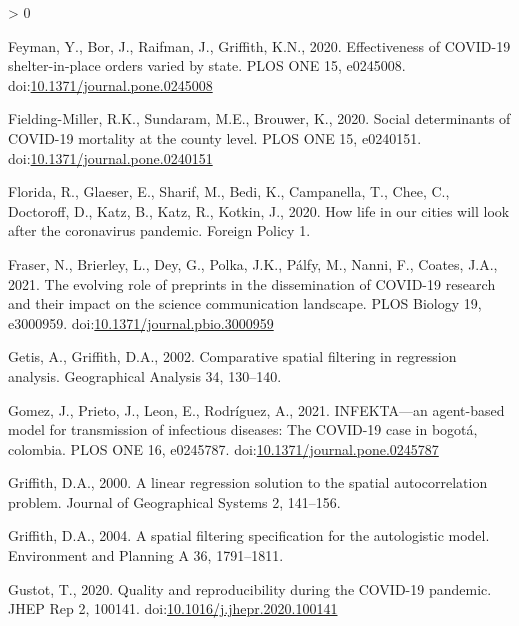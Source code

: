 \documentclass[]{elsarticle} %
\newlength{\cslhangindent}
\newenvironment{CSLReferences}[2] %
 {%
  \setlength{\parindent}{0pt}
  \ifodd #1 \everypar{\setlength{\hangindent}{\cslhangindent}}\ignorespaces\fi
  \ifnum #2 > 0
  \setlength{\parskip}{#2\baselineskip}
  \fi
 }%
 {}
\begin{document}
\begin{CSLReferences}{1}{0}
\leavevmode\hypertarget{ref-Feyman2020effectiveness}{}%
Feyman, Y., Bor, J., Raifman, J., Griffith, K.N., 2020. Effectiveness of
COVID-19 shelter-in-place orders varied by state. PLOS ONE 15, e0245008.
doi:\href{https://doi.org/10.1371/journal.pone.0245008}{10.1371/journal.pone.0245008}

\leavevmode\hypertarget{ref-Fielding2020social}{}%
Fielding-Miller, R.K., Sundaram, M.E., Brouwer, K., 2020. Social
determinants of COVID-19 mortality at the county level. PLOS ONE 15,
e0240151.
doi:\href{https://doi.org/10.1371/journal.pone.0240151}{10.1371/journal.pone.0240151}

\leavevmode\hypertarget{ref-Florida2020how}{}%
Florida, R., Glaeser, E., Sharif, M., Bedi, K., Campanella, T., Chee,
C., Doctoroff, D., Katz, B., Katz, R., Kotkin, J., 2020. How life in our
cities will look after the coronavirus pandemic. Foreign Policy 1.

\leavevmode\hypertarget{ref-Fraser2021evolving}{}%
Fraser, N., Brierley, L., Dey, G., Polka, J.K., Pálfy, M., Nanni, F.,
Coates, J.A., 2021. The evolving role of preprints in the dissemination
of COVID-19 research and their impact on the science communication
landscape. PLOS Biology 19, e3000959.
doi:\href{https://doi.org/10.1371/journal.pbio.3000959}{10.1371/journal.pbio.3000959}

\leavevmode\hypertarget{ref-Getis2002comparative}{}%
Getis, A., Griffith, D.A., 2002. Comparative spatial filtering in
regression analysis. Geographical Analysis 34, 130--140.

\leavevmode\hypertarget{ref-Gomez2021infekta}{}%
Gomez, J., Prieto, J., Leon, E., Rodríguez, A., 2021. INFEKTA---an
agent-based model for transmission of infectious diseases: The COVID-19
case in bogotá, colombia. PLOS ONE 16, e0245787.
doi:\href{https://doi.org/10.1371/journal.pone.0245787}{10.1371/journal.pone.0245787}

\leavevmode\hypertarget{ref-Griffith2000linear}{}%
Griffith, D.A., 2000. A linear regression solution to the spatial
autocorrelation problem. Journal of Geographical Systems 2, 141--156.

\leavevmode\hypertarget{ref-Griffith2004spatial}{}%
Griffith, D.A., 2004. A spatial filtering specification for the
autologistic model. Environment and Planning A 36, 1791--1811.

\leavevmode\hypertarget{ref-Gustot2020quality}{}%
Gustot, T., 2020. Quality and reproducibility during the COVID-19
pandemic. JHEP Rep 2, 100141.
doi:\href{https://doi.org/10.1016/j.jhepr.2020.100141}{10.1016/j.jhepr.2020.100141}


\end{CSLReferences}
\end{document}
